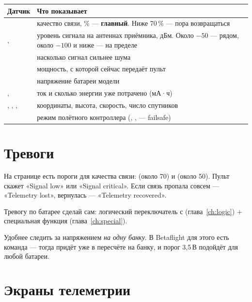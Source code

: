 \begin{center}\small
\renewcommand{\arraystretch}{1.2}
\begin{tabularx}{\linewidth}{@{}L{22mm}Y@{}}
\toprule
\textbf{Датчик} & \textbf{Что показывает} \\
\midrule
{} & качество связи, \% --- \textbf{главный}. Ниже 70\,\% --- пора возвращаться \\
,  & уровень сигнала на антеннах приёмника, дБм. Около $-50$ --- рядом, около
  $-100$ и ниже --- на пределе \\
 & насколько сигнал сильнее шума \\
 & мощность, с которой сейчас передаёт пульт \\
 & напряжение батареи модели \\
,  & ток и сколько энергии уже потрачено (мА·ч) \\
, , ,  & координаты, высота, скорость, число спутников \\
 & режим полётного контроллера (, ,  --- failsafe) \\
\bottomrule
\end{tabularx}
\end{center}

\section{Тревоги}

На странице  есть пороги для качества связи:  (около 70) и
 (около 50). Пульт скажет «Signal low» или «Signal critical». Если связь
пропала совсем --- «Telemetry lost», вернулась --- «Telemetry recovered».

Тревогу по батарее сделай сам: логический переключатель  с 
(глава~\ref{ch:logic}) + специальная функция  (глава~\ref{ch:special}).

\begin{tip}
Удобнее следить за напряжением \emph{на одну банку}. В Betaflight для этого есть команда
 --- тогда  придёт уже в пересчёте на банку,
и порог 3,5\,В подойдёт для любой батареи.
\end{tip}

\section{Экраны телеметрии}

